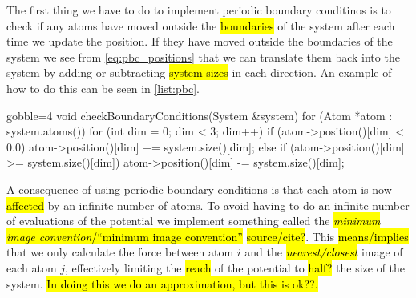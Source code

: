 The first thing we have to do to implement periodic boundary conditinos is to check if any atoms have moved outside the \hl{boundaries} of the system after each time we update the position. If they have moved outside the boundaries of the system we see from \cref{eq:pbc_positions} that we can translate them back into the system by adding or subtracting \hl{system sizes} in each direction. An example of how to do this can be seen in \cref{list:pbc}.
\begin{listing}[!htb]%
\begin{cppcode*}{gobble=4}
    void checkBoundaryConditions(System &system) {
        for (Atom *atom : system.atoms()) {
            for (int dim = 0; dim < 3; dim++) {
                if (atom->position()[dim] < 0.0) 
                    atom->position()[dim] += system.size()[dim];
                else if (atom->position()[dim] >= system.size()[dim]) 
                    atom->position()[dim] -= system.size()[dim];
            }
        }
    }
\end{cppcode*}
\caption{%
    . \hl{assumes no more than one box outside...}%
    \label{list:pbc}%
}%
\end{listing}%

A consequence of using periodic boundary conditions is that each atom is now \hl{affected} by an infinite number of atoms. To avoid having to do an infinite number of evaluations of the potential we implement something called the \hl{\emph{minimum image convention}/``minimum image convention''} \hl{source/cite?}. This \hl{means/implies} that we only calculate the force between atom $i$ and the \hl{\emph{nearest/closest}} image of each atom $j$, effectively limiting the \hl{reach} of the potential to \hl{half?} the size of the system.  \hl{In doing this we do an approximation, but this is ok??.}

